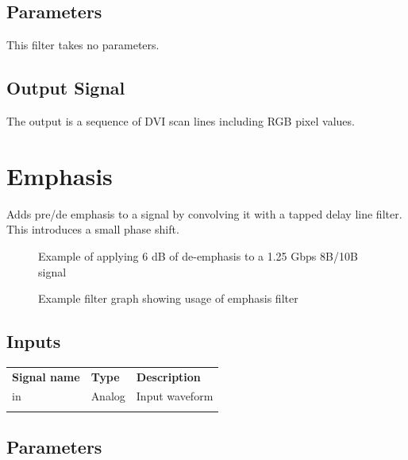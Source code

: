 \subsection{Parameters}

This filter takes no parameters.

\subsection{Output Signal}

The output is a sequence of DVI scan lines including RGB pixel values.

\pagebreak
\section{Emphasis}
\label{filter:emphasis}

Adds pre/de emphasis to a signal by convolving it with a tapped delay line filter. This introduces a small phase shift.

\begin{figure}[h]
\centering
{}
\caption{Example of applying 6 dB of de-emphasis to a 1.25 Gbps 8B/10B signal}
\label{filter_emphasis}
\end{figure}

\begin{figure}[h]
\centering
{}
\caption{Example filter graph showing usage of emphasis filter}
\label{filter_emphasis}
\end{figure}

\FloatBarrier

\subsection{Inputs}

\begin{tabularx}{16cm}{llX}
\thickhline
\textbf{Signal name} & \textbf{Type} & \textbf{Description} \\
\thickhline
in & Analog & Input waveform\\
\thickhline
\end{tabularx}

\subsection{Parameters}


